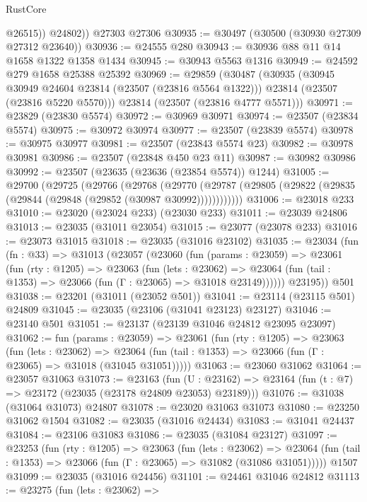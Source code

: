 \begin{lexlean}{RustCore}
\begin{coremodule}
            @26515))
        @24802))
    @27303
    @27306
@30935 := @30497 (@30500 (@30930 @27309 @27312 @23640))
@30936 := @24555 @280
@30943 := @30936 @88 @11 @14 @1658 @1322 @1358 @1434
@30945 := @30943 @5563 @1316
@30949 := @24592 @279 @1658 @25388 @25392
@30969 := @29859
    (@30487
      (@30935
        (@30945 @30949 @24604 @23814 (@23507 (@23816 @5564 @1322)))
        @23814
        (@23507 (@23816 @5220 @5570)))
      @23814
      (@23507 (@23816 @4777 @5571)))
@30971 := @23829 (@23830 @5574)
@30972 := @30969 @30971
@30974 := @23507 (@23834 @5574)
@30975 := @30972 @30974
@30977 := @23507 (@23839 @5574)
@30978 := @30975 @30977
@30981 := @23507 (@23843 @5574 @23)
@30982 := @30978 @30981
@30986 := @23507 (@23848 @450 @23 @11)
@30987 := @30982 @30986
@30992 := @23507 (@23635 (@23636 (@23854 @5574)) @1244)
@31005 := @29700
    (@29725
      (@29766
        (@29768
          (@29770 (@29787 (@29805 (@29822 (@29835 (@29844 (@29848 (@29852 (@30987 @30992))))))))))))
@31006 := @23018 @233
@31010 := @23020 (@23024 @233) (@23030 @233)
@31011 := @23039 @24806
@31013 := @23035 (@31011 @23054)
@31015 := @23077 (@23078 @233)
@31016 := @23073 @31015
@31018 := @23035 (@31016 @23102)
@31035 := @23034
    (fun (fn : @33) =>
    @31013
      (@23057
        (@23060
          (fun (params : @23059) =>
          @23061
            (fun (rty : @1205) =>
            @23063
              (fun (lets : @23062) =>
              @23064 (fun (tail : @1353) => @23066 (fun (Γ : @23065) => @31018 @23149))))))
        @23195))
    @501
@31038 := @23201 (@31011 (@23052 @501))
@31041 := @23114 (@23115 @501) @24809
@31045 := @23035 (@23106 (@31041 @23123) @23127)
@31046 := @23140 @501
@31051 := @23137 (@23139 @31046 @24812 @23095 @23097)
@31062 := fun (params : @23059) =>
  @23061
    (fun (rty : @1205) =>
    @23063
      (fun (lets : @23062) =>
      @23064 (fun (tail : @1353) => @23066 (fun (Γ : @23065) => @31018 (@31045 @31051)))))
@31063 := @23060 @31062
@31064 := @23057 @31063
@31073 := @23163
    (fun (U : @23162) => @23164 (fun (t : @7) => @23172 (@23035 (@23178 @24809 @23053) @23189)))
@31076 := @31038 (@31064 @31073) @24807
@31078 := @23020 @31063 @31073
@31080 := @23250 @31062 @1504
@31082 := @23035 (@31016 @24434)
@31083 := @31041 @24437
@31084 := @23106 @31083
@31086 := @23035 (@31084 @23127)
@31097 := @23253
    (fun (rty : @1205) =>
    @23063
      (fun (lets : @23062) =>
      @23064 (fun (tail : @1353) => @23066 (fun (Γ : @23065) => @31082 (@31086 @31051)))))
    @1507
@31099 := @23035 (@31016 @24456)
@31101 := @24461 @31046 @24812
@31113 := @23275
    (fun (lets : @23062) =>

\end{coremodule}
\end{lexlean}
